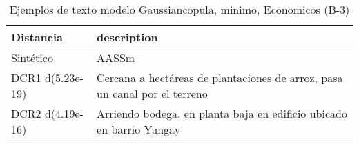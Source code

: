 \begin{table}[H]
\centering
\fontsize{10}{14}\selectfont
\caption{Ejemplos de texto modelo Gaussiancopula, minimo, Economicos (B-3)}
\label{table-example-economicos-b-3-gaussiancopula-min-text}
\begin{tabular}{|l|m{35em}|}
\hline
\rowcolor[gray]{0.8}
Distancia & description \\
\hline Sintético & AASSm \\
\hline DCR1 d(5.23e-19) & Cercana a hect\'areas  de plantaciones de arroz, pasa un canal por el terreno \\
\hline DCR2 d(4.19e-16) & Arriendo bodega, en planta baja en edificio ubicado en barrio Yungay \\
\hline
\end{tabular}
\end{table}
